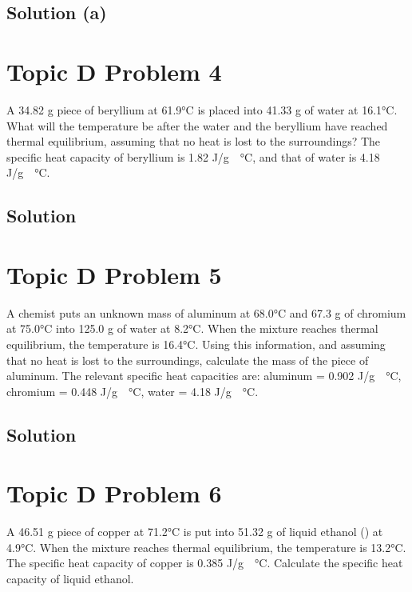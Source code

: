 \documentclass[10pt]{article}
\begin{document}
        \subsection{Solution (a)}

    \pagebreak
    \section{Topic D Problem 4}
        A 34.82 g piece of beryllium at 61.9\unit{\celsius} is placed into 41.33 g of water at 16.1\unit{\celsius}. 
        What will the temperature be after the water and the beryllium have reached thermal equilibrium, assuming that no heat is lost to the surroundings? 
        The specific heat capacity of beryllium is 1.82 \unit{\joule/\gram\cdot\celsius}, and that of water is 4.18 \unit{\joule/\gram\cdot\celsius}.

        \subsection{Solution}

    \pagebreak
    \section{Topic D Problem 5}
        A chemist puts an unknown mass of aluminum at 68.0\unit{\celsius} and 67.3 g of chromium at 75.0\unit{\celsius} into 125.0 g of water at 8.2\unit{\celsius}. 
        When the mixture reaches thermal equilibrium, the temperature is 16.4\unit{\celsius}. 
        Using this information, and assuming that no heat is lost to the surroundings, calculate the mass of the piece of aluminum. 
        The relevant specific heat capacities are: aluminum = 0.902 \unit{\joule/\gram\cdot\celsius}, chromium = 0.448 \unit{\joule/\gram\cdot\celsius}, water = 4.18 \unit{\joule/\gram\cdot\celsius}.

        \subsection{Solution}

    \pagebreak
    \section{Topic D Problem 6}
        A 46.51 g piece of copper at 71.2\unit{\celsius} is put into 51.32 g of liquid ethanol () at 4.9\unit{\celsius}.
        When the mixture reaches thermal equilibrium, the temperature is 13.2\unit{\celsius}. 
        The specific heat capacity of copper is 0.385 \unit{\joule/\gram\cdot\celsius}. 
        Calculate the specific heat capacity of liquid ethanol.
\end{document}

